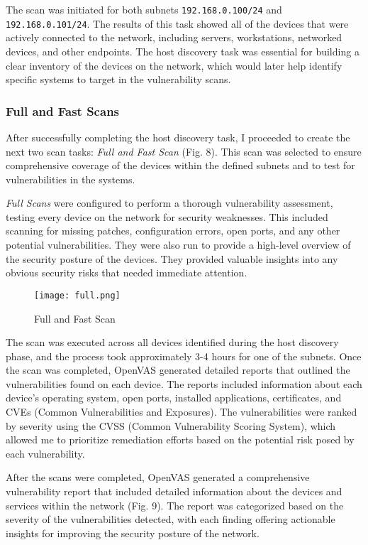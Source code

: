 \documentclass[twocolumn]{article}
\begin{document}
The scan was initiated for both subnets \texttt{192.168.0.100/24} and \texttt{192.168.0.101/24}. The results of this task showed all of the devices that were actively connected to the network, including servers, workstations, networked devices, and other endpoints. The host discovery task was essential for building a clear inventory of the devices on the network, which would later help identify specific systems to target in the vulnerability scans.

\subsubsection{Full and Fast Scans}

After successfully completing the host discovery task, I proceeded to create the next two scan tasks: \textit{Full and Fast Scan} (Fig. 8). This scan was selected to ensure comprehensive coverage of the devices within the defined subnets and to test for vulnerabilities in the systems.

\textit{Full Scans} were configured to perform a thorough vulnerability assessment, testing every device on the network for security weaknesses. This included scanning for missing patches, configuration errors, open ports, and any other potential vulnerabilities. They were also run to provide a high-level overview of the security posture of the devices. They provided valuable insights into any obvious security risks that needed immediate attention.

\begin{figure}[h!]
    \centering
    \texttt{[image: full.png]}
    \caption{Full and Fast Scan}
\end{figure}

The scan was executed across all devices identified during the host discovery phase, and the process took approximately 3-4 hours for one of the subnets. Once the scan was completed, OpenVAS generated detailed reports that outlined the vulnerabilities found on each device. The reports included information about each device's operating system, open ports, installed applications, certificates, and CVEs (Common Vulnerabilities and Exposures). The vulnerabilities were ranked by severity using the CVSS (Common Vulnerability Scoring System), which allowed me to prioritize remediation efforts based on the potential risk posed by each vulnerability.

After the scans were completed, OpenVAS generated a comprehensive vulnerability report that included detailed information about the devices and services within the network (Fig. 9). The report was categorized based on the severity of the vulnerabilities detected, with each finding offering actionable insights for improving the security posture of the network. 
\end{document}
